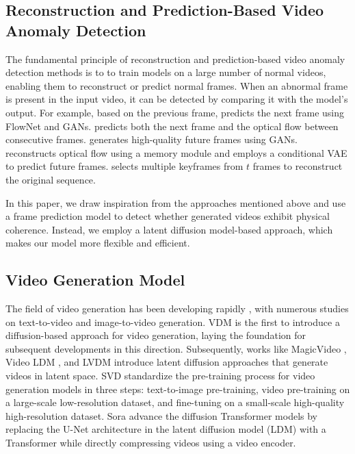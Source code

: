 \subsection{Reconstruction and Prediction-Based Video Anomaly Detection}

The fundamental principle of reconstruction and prediction-based video anomaly detection methods is to to train models on a large number of normal videos, enabling them to reconstruct or predict normal frames. When an abnormal frame is present in the input video, it can be detected by comparing it with the model's output. For example, based on the previous frame, \cite{liu2018future} predicts the next frame using FlowNet\cite{flownet} and GANs\cite{GANs}. \cite{nguyen2019anomaly} predicts both the next frame and the optical flow between consecutive frames. \cite{zaheer2020old} generates high-quality future frames using GANs. \cite{hf2vad} reconstructs optical flow using a memory module and employs a conditional VAE to predict future frames. \cite{yang2023video} selects multiple keyframes from $t$ frames to reconstruct the original sequence.


In this paper, we draw inspiration from the approaches mentioned above and use a frame prediction model to detect whether generated videos exhibit physical coherence. Instead, we employ a latent diffusion model-based approach, which makes our model more flexible and efficient.



\subsection{Video Generation Model}

The field of video generation has been developing rapidly \cite{VideoLDM, videocrafter1, videocrafter2, seer, aid, animatediff, harvey2022flexible, imagen, ho2022video, text2performer, text2video, singer2022make, 3modelscope, dynamicrafter, magicvideo, anonymous2024d}, with numerous studies on text-to-video\cite{text2video, tuneavideo, videocrafter1, videocrafter2} and image-to-video generation\cite{dynamicrafter, animatediff, chen2023motion}. VDM \cite{ho2022video} is the first to introduce a diffusion-based approach for video generation, laying the foundation for subsequent developments in this direction. Subsequently, works like MagicVideo \cite{magicvideo}, Video LDM \cite{VideoLDM}, and LVDM \cite{LVDM} introduce latent diffusion approaches that generate videos in latent space. SVD\cite{svd} standardize the pre-training process for video generation models in three steps: text-to-image pre-training, video pre-training on a large-scale low-resolution dataset, and fine-tuning on a small-scale high-quality high-resolution dataset. Sora \cite{sora} advance the diffusion Transformer models by replacing the U-Net architecture in the latent diffusion model (LDM) with a Transformer while directly compressing videos using a video encoder.

